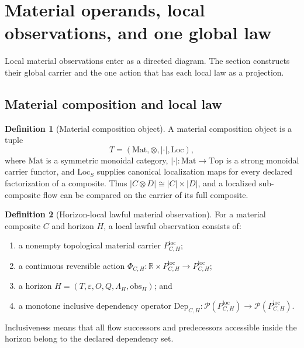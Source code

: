 \documentclass[11pt]{article}
\theoremstyle{definition}
\newtheorem{definition}{Definition}
\begin{document}
\section{Material operands, local observations, and one global law}

Local material observations enter as a directed diagram. The section constructs their global carrier and the one action that has each local law as a projection.

\subsection{Material composition and local law}

\begin{definition}[Material composition object]
A material composition object is a tuple
\[
T = (\mathrm{Mat}, \otimes, |\cdot|, \mathrm{Loc}),
\]
where $\mathrm{Mat}$ is a symmetric monoidal category, $|\cdot| : \mathrm{Mat} \to \mathrm{Top}$ is a strong monoidal carrier functor, and $\mathrm{Loc}_S$ supplies canonical localization maps for every declared factorization of a composite. Thus $|C \otimes D| \cong |C| \times |D|$, and a localized sub-composite flow can be compared on the carrier of its full composite.
\end{definition}

\begin{definition}[Horizon-local lawful material observation]
For a material composite $C$ and horizon $H$, a local lawful observation consists of:
\begin{enumerate}[label=\arabic*.]
\item a nonempty topological material carrier $P^{\mathrm{loc}}_{C,H}$;
\item a continuous reversible action $\Phi_{C,H} : \mathbb{R} \times P^{\mathrm{loc}}_{C,H} \to P^{\mathrm{loc}}_{C,H}$;
\item a horizon $H = (T, \varepsilon, O, Q, \Lambda_H, \mathrm{obs}_H)$; and
\item a monotone inclusive dependency operator $\mathrm{Dep}_{C,H} : \mathcal{P}(P^{\mathrm{loc}}_{C,H}) \to \mathcal{P}(P^{\mathrm{loc}}_{C,H})$.
\end{enumerate}
Inclusiveness means that all flow successors and predecessors accessible inside the horizon belong to the declared dependency set.
\end{definition}
\end{document}
